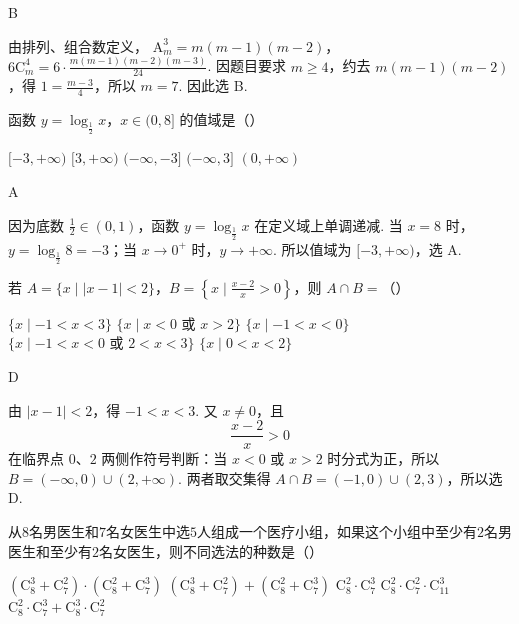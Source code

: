 \begin{answer}
B
\end{answer}

\begin{solution}
由排列、组合数定义，
\(\mathrm A_m^3=m(m-1)(m-2)\)，\(6\mathrm C_m^4=6\cdot\frac{m(m-1)(m-2)(m-3)}{24}\).
因题目要求 \(m\geq4\)，约去 \(m(m-1)(m-2)\)，得 \(1=\frac{m-3}{4}\)，所以 \(m=7\). 因此选 B.
\end{solution}


\begin{problem}

函数 \(y = \log_{\frac{1}{2}} x\)，\(x \in (0, 8]\) 的值域是（\quad）

\choicesfive
    {\([-3, +\infty)\)}
    {\([3, +\infty)\)}
    {\((-\infty, -3]\)}
    {\((-\infty, 3]\)}
    {\((0, +\infty)\)}
\end{problem}

\begin{answer}
A
\end{answer}

\begin{solution}
因为底数 \(\frac{1}{2}\in(0,1)\)，函数 \(y=\log_{\frac{1}{2}}x\) 在定义域上单调递减. 当 \(x=8\) 时，\(y=\log_{\frac{1}{2}}8=-3\)；当 \(x\to0^+\) 时，\(y\to+\infty\). 所以值域为 \([-3,+\infty)\)，选 A.
\end{solution}


\begin{problem}

若 \(A = \{x \mid |x - 1| < 2\}\)，\(B = \left\{x \mid \frac{x - 2}{x} > 0 \right\}\)，则 \(A \cap B =\)（\quad）

\choicesfive
    {\(\{x\mid -1 < x < 3\}\)}
    {\(\{x \mid x < 0 \text{\ 或\ } x > 2\}\)}
    {\(\{x\mid -1 < x < 0\}\)}
    {\(\{x\mid -1 < x < 0 \text{\ 或\ } 2 < x < 3\}\)}
    {\(\{x\mid 0 < x < 2\}\)}
\end{problem}

\begin{answer}
D
\end{answer}

\begin{solution}
由 \(|x-1|<2\)，得 \(-1<x<3\). 又 \(x\neq0\)，且
\[
\frac{x-2}{x}>0
\]
在临界点 \(0\)、\(2\) 两侧作符号判断：当 \(x<0\) 或 \(x>2\) 时分式为正，所以 \(B=(-\infty,0)\cup(2,+\infty)\). 两者取交集得 \(A\cap B=(-1,0)\cup(2,3)\)，所以选 D.
\end{solution}


\begin{problem}

从\(8\)名男医生和\(7\)名女医生中选\(5\)人组成一个医疗小组，如果这个小组中至少有\(2\)名男医生和至少有\(2\)名女医生，则不同选法的种数是（\quad）

\choicesfive
    {\(\left(\mathrm C_8^3 + \mathrm C_7^2\right) \cdot \left(\mathrm C_8^2 + \mathrm C_7^3\right)\)}
    {\(\left(\mathrm C_8^3 + \mathrm C_7^2\right) + \left(\mathrm C_8^2 + \mathrm C_7^3\right)\)}
    {\(\mathrm C_8^2 \cdot \mathrm C_7^3\)}
    {\(\mathrm C_8^2 \cdot \mathrm C_7^2 \cdot \mathrm C_{11}^3\)}
    {\(\mathrm C_8^2 \cdot \mathrm C_7^3 + \mathrm C_8^3 \cdot \mathrm C_7^2\)}
\end{problem}

